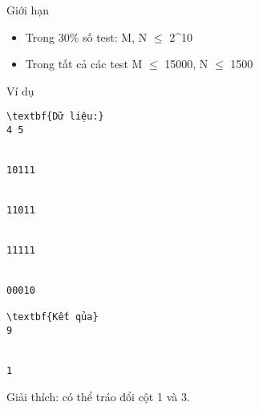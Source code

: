 Giới hạn
\begin{itemize}
	\item     Trong 30\% số test: M, N  $\le$  2^10   
	\item     Trong tất cả các test M  $\le$  15000, N  $\le$  1500   
\end{itemize}
Ví dụ
\begin{verbatim}
\textbf{Dữ liệu:}
4 5


10111


11011


11111


00010

\textbf{Kết qủa}
9


1
\end{verbatim}

   Giải thích: có thể tráo đổi cột 1 và 3.
